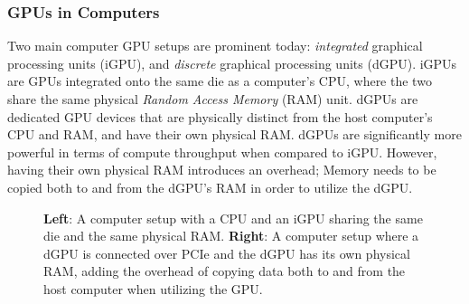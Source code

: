 \subsubsection{GPUs in Computers}

Two main computer GPU setups are prominent today: \textit{integrated} graphical processing units (iGPU), and \textit{discrete} graphical processing units (dGPU).
iGPUs are GPUs integrated onto the same die as a computer's CPU, where the two share the same physical \textit{Random Access Memory} (RAM) unit.
dGPUs are dedicated GPU devices that are physically distinct from the host computer's CPU and RAM, and have their own physical RAM.
dGPUs are significantly more powerful in terms of compute throughput when compared to iGPU.
However, having their own physical RAM introduces an overhead;
Memory needs to be copied both to and from the dGPU's RAM in order to utilize the dGPU.

\begin{figure}[h!]\label{figure:igpu-and-dgpu-system}
\begin{center}
\hspace{8em}
\caption{\textbf{Left}: A computer setup with a CPU and an iGPU sharing the same die and the same physical RAM. \textbf{Right}: A computer setup where a dGPU is connected over PCIe and the dGPU has its own physical RAM, adding the overhead of copying data both to and from the host computer when utilizing the GPU.}
\end{center}
\end{figure}
